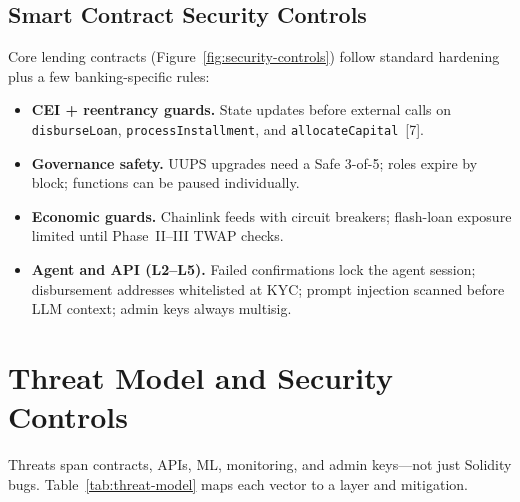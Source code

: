 \documentclass[12pt, a4paper]{report}
\begin{document}
\subsection{Smart Contract Security Controls}
\label{sec:contract-security}

Core lending contracts (Figure~\ref{fig:security-controls}) follow standard hardening plus a few banking-specific rules:

\begin{itemize}[noitemsep]
\item \textbf{CEI + reentrancy guards.} State updates before external calls on \texttt{disburseLoan}, \texttt{processInstallment}, and \texttt{allocateCapital}~[7].
\item \textbf{Governance safety.} UUPS upgrades need a Safe 3-of-5; roles expire by block; functions can be paused individually.
\item \textbf{Economic guards.} Chainlink feeds with circuit breakers; flash-loan exposure limited until Phase~II--III TWAP checks.
\item \textbf{Agent and API (L2--L5).} Failed confirmations lock the agent session; disbursement addresses whitelisted at KYC; prompt injection scanned before LLM context; admin keys always multisig.
\end{itemize}

\section{Threat Model and Security Controls}
\label{sec:threat-model}

Threats span contracts, APIs, ML, monitoring, and admin keys---not just Solidity bugs. Table~\ref{tab:threat-model} maps each vector to a layer and mitigation.
\end{document}
